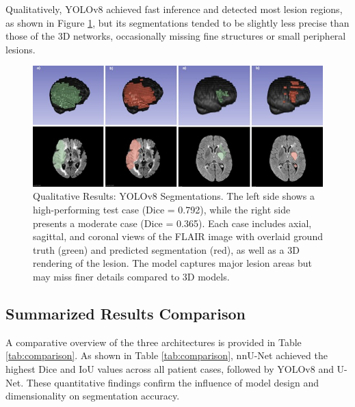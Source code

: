 \documentclass[12pt]{article}
\begin{document}
Qualitatively, YOLOv8 achieved fast inference and detected most lesion regions, as shown in Figure \ref{fig:yolov8_qualitative}, but its segmentations tended to be slightly less precise than those of the 3D networks, occasionally missing fine structures or small peripheral lesions.
%
\begin{figure}[tp]
    \centering
    \includegraphics[width=\textwidth]{figures/Figure 6.jpg}
    \caption{Qualitative Results: YOLOv8 Segmentations. The left side shows a high-performing test case (Dice = 0.792), while the right side presents a moderate case (Dice = 0.365). Each case includes axial, sagittal, and coronal views of the FLAIR image with overlaid ground truth (green) and predicted segmentation (red), as well as a 3D rendering of the lesion. The model captures major lesion areas but may miss finer details compared to 3D models.}
    \label{fig:yolov8_qualitative}
\end{figure}


\subsection{Summarized Results Comparison} 
\label{subsec:comparison}

A comparative overview of the three architectures is provided in Table \ref{tab:comparison}. As shown in Table \ref{tab:comparison}, nnU-Net achieved the highest Dice and IoU values across all patient cases, followed by YOLOv8 and U-Net. These quantitative findings confirm the influence of model design and dimensionality on segmentation accuracy.

\begin{table}[tp]
\centering
{}
\caption{Comparison of segmentation models on the test set (N=25). The nnU-Net achieved the highest Dice and IoU scores, indicating superior segmentation accuracy and robustness. YOLOv8 provided competitive performance with efficient inference, while U-Net showed limited generalization capabilities.}
\label{tab:comparison}
\end{table}
\end{document}
